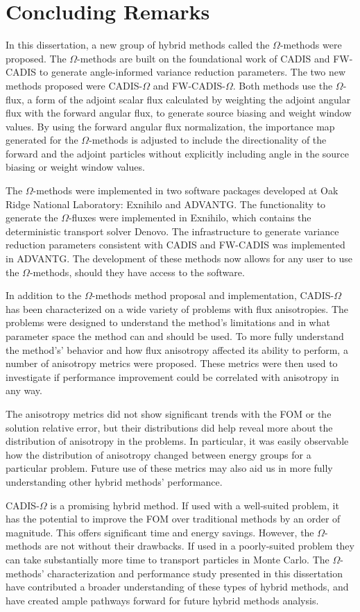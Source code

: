 \section{Concluding Remarks}
\label{sec:concluding-remarks}

In this dissertation, a new group of hybrid methods called the $\Omega$-methods
were
proposed. The $\Omega$-methods are built on the foundational work of CADIS
and FW-CADIS to generate angle-informed variance reduction parameters. The two
new methods proposed were CADIS-$\Omega$ and FW-CADIS-$\Omega$. Both methods use
the $\Omega$-flux, a form of the adjoint scalar flux calculated by weighting the
adjoint angular flux with the forward angular flux, to generate source biasing and weight window
values. By using the forward angular flux
normalization, the importance map generated for the
$\Omega$-methods is adjusted to include the directionality of
the forward and the adjoint particles without explicitly including angle
in the source biasing or weight window values.

The $\Omega$-methods were implemented in two software packages developed at Oak
Ridge National Laboratory: Exnihilo and ADVANTG. The functionality to generate
the $\Omega$-fluxes were implemented in Exnihilo, which contains the
deterministic transport solver Denovo. The infrastructure to generate variance
reduction parameters consistent with CADIS and FW-CADIS was implemented in
ADVANTG. The development of these methods now allows for any user to use the
$\Omega$-methods, should they have access to the software.

In addition to the $\Omega$-methods method proposal and
implementation, CADIS-$\Omega$ has been
characterized on a wide variety of problems with flux anisotropies. The problems
were designed to understand the method's limitations and in what parameter space
the method can and should be used. To more fully understand the method's' behavior and how
flux anisotropy affected its ability to perform, a number of anisotropy metrics
were proposed. These metrics were then used
to investigate if performance improvement could be correlated with
anisotropy in any way.

The anisotropy metrics did not show significant trends with the FOM or the
solution relative error, but their distributions did help reveal more about the
distribution of anisotropy in the problems. In particular, it was easily
observable how the distribution of anisotropy changed between energy groups for
a particular problem. Future use of these metrics may also
aid us in more fully understanding other hybrid methods' performance.

CADIS-$\Omega$ is a promising hybrid method. If used with a well-suited problem,
it has the potential to improve the FOM over traditional methods by an order of
magnitude. This offers significant time and energy savings. However, the
$\Omega$-methods are not without their drawbacks. If used in a poorly-suited
problem they can take substantially more time to transport particles in
Monte Carlo. The $\Omega$-methods' characterization and performance study
presented in this dissertation have contributed a broader understanding of these types of
hybrid methods, and have created ample pathways forward for future hybrid
methods analysis.


